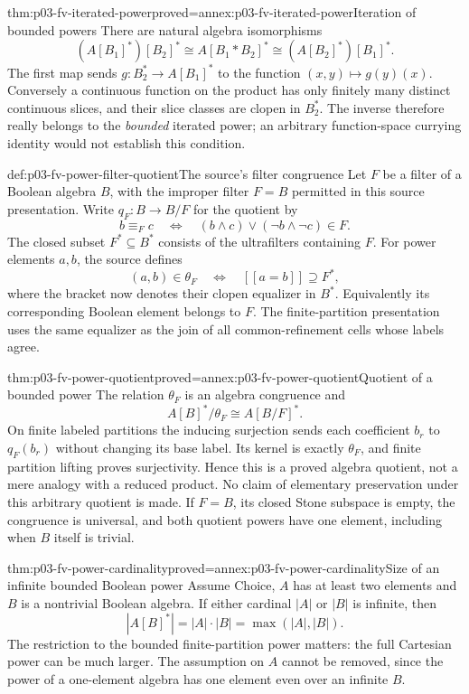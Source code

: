 \begin{hbtheorem}{thm:p03-fv-iterated-power}{proved=annex:p03-fv-iterated-power}{Iteration of bounded powers}
There are natural algebra isomorphisms
\[
       (A[B_1]^*)[B_2]^*\cong A[B_1*B_2]^*
              \cong (A[B_2]^*)[B_1]^*.
\]
The first map sends \(g:B_2^*\to A[B_1]^*\) to the function
\((x,y)\mapsto g(y)(x)\). Conversely a continuous function on the
product has only finitely many distinct continuous slices, and their
slice classes are clopen in \(B_2^*\). The inverse therefore really
belongs to the \emph{bounded} iterated power; an arbitrary function-space
currying identity would not establish this condition.
\end{hbtheorem}

\begin{hbdefinition}{def:p03-fv-power-filter-quotient}{The source's filter congruence}
Let \(F\) be a filter of a Boolean algebra \(B\), with the improper
filter \(F=B\) permitted in this source presentation.
Write \(q_F:B\to B/F\) for the quotient by
\[
 b\equiv_F c\quad\Longleftrightarrow\quad
              (b\wedge c)\vee(\neg b\wedge\neg c)\in F.
\]
The closed subset \(F^*\subseteq B^*\) consists of the ultrafilters
containing \(F\). For power elements \(a,b\), the source defines
\[
             (a,b)\in\theta_F
             \quad\Longleftrightarrow\quad
             [\![a=b]\!]\supseteq F^*,
\]
where the bracket now denotes their clopen equalizer in \(B^*\).
Equivalently its corresponding Boolean element belongs to \(F\).
The finite-partition presentation uses the same equalizer as the join
of all common-refinement cells whose labels agree.
\end{hbdefinition}

\begin{hbtheorem}{thm:p03-fv-power-quotient}{proved=annex:p03-fv-power-quotient}{Quotient of a bounded power}
The relation \(\theta_F\) is an algebra congruence and
\[
                    A[B]^*/\theta_F\cong A[B/F]^*.
\]
On finite labeled partitions the inducing surjection sends each coefficient
\(b_r\) to \(q_F(b_r)\) without changing its base label. Its kernel
is exactly \(\theta_F\), and finite partition lifting proves
surjectivity. Hence this is a proved algebra quotient, not a mere
analogy with a reduced product. No claim of elementary preservation under
this arbitrary quotient is made. If \(F=B\), its closed Stone subspace
is empty, the congruence is universal, and both quotient powers have one
element, including when \(B\) itself is trivial.
\end{hbtheorem}

\begin{hbtheorem}{thm:p03-fv-power-cardinality}{proved=annex:p03-fv-power-cardinality}{Size of an infinite bounded Boolean power}
Assume Choice, \(A\) has at least two elements and \(B\) is a
nontrivial Boolean algebra. If either cardinal \(|A|\) or \(|B|\)
is infinite, then
\[
                 |A[B]^*|=|A|\cdot|B|=\max(|A|,|B|).
\]
The restriction to the bounded finite-partition power matters: the full
Cartesian power can be much larger. The assumption on \(A\) cannot
be removed, since the power of a one-element algebra has one element
even over an infinite \(B\).
\end{hbtheorem}
